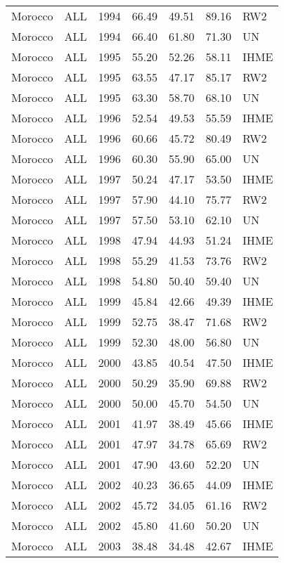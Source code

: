 \begin{longtable}{lllrrrl}
  Morocco & ALL & 1994 & 66.49 & 49.51 & 89.16 & RW2 \\ 
  Morocco & ALL & 1994 & 66.40 & 61.80 & 71.30 & UN \\ 
  Morocco & ALL & 1995 & 55.20 & 52.26 & 58.11 & IHME \\ 
  Morocco & ALL & 1995 & 63.55 & 47.17 & 85.17 & RW2 \\ 
  Morocco & ALL & 1995 & 63.30 & 58.70 & 68.10 & UN \\ 
  Morocco & ALL & 1996 & 52.54 & 49.53 & 55.59 & IHME \\ 
  Morocco & ALL & 1996 & 60.66 & 45.72 & 80.49 & RW2 \\ 
  Morocco & ALL & 1996 & 60.30 & 55.90 & 65.00 & UN \\ 
  Morocco & ALL & 1997 & 50.24 & 47.17 & 53.50 & IHME \\ 
  Morocco & ALL & 1997 & 57.90 & 44.10 & 75.77 & RW2 \\ 
  Morocco & ALL & 1997 & 57.50 & 53.10 & 62.10 & UN \\ 
  Morocco & ALL & 1998 & 47.94 & 44.93 & 51.24 & IHME \\ 
  Morocco & ALL & 1998 & 55.29 & 41.53 & 73.76 & RW2 \\ 
  Morocco & ALL & 1998 & 54.80 & 50.40 & 59.40 & UN \\ 
  Morocco & ALL & 1999 & 45.84 & 42.66 & 49.39 & IHME \\ 
  Morocco & ALL & 1999 & 52.75 & 38.47 & 71.68 & RW2 \\ 
  Morocco & ALL & 1999 & 52.30 & 48.00 & 56.80 & UN \\ 
  Morocco & ALL & 2000 & 43.85 & 40.54 & 47.50 & IHME \\ 
  Morocco & ALL & 2000 & 50.29 & 35.90 & 69.88 & RW2 \\ 
  Morocco & ALL & 2000 & 50.00 & 45.70 & 54.50 & UN \\ 
  Morocco & ALL & 2001 & 41.97 & 38.49 & 45.66 & IHME \\ 
  Morocco & ALL & 2001 & 47.97 & 34.78 & 65.69 & RW2 \\ 
  Morocco & ALL & 2001 & 47.90 & 43.60 & 52.20 & UN \\ 
  Morocco & ALL & 2002 & 40.23 & 36.65 & 44.09 & IHME \\ 
  Morocco & ALL & 2002 & 45.72 & 34.05 & 61.16 & RW2 \\ 
  Morocco & ALL & 2002 & 45.80 & 41.60 & 50.20 & UN \\ 
  Morocco & ALL & 2003 & 38.48 & 34.48 & 42.67 & IHME \\ 

\end{longtable}
